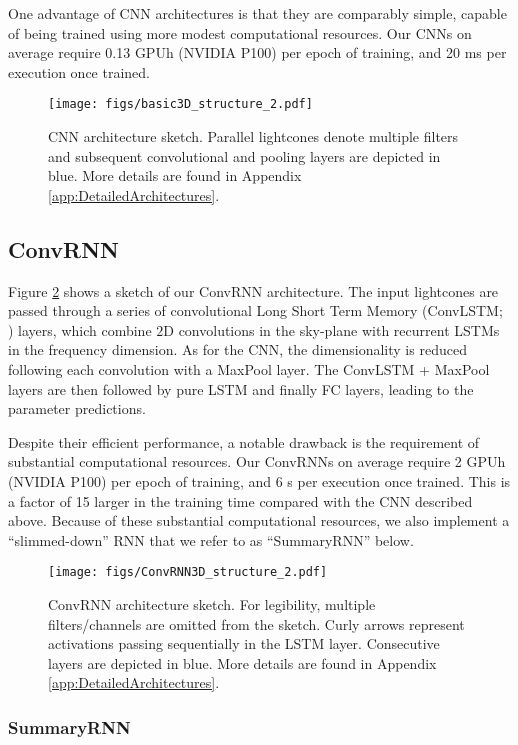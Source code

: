 \documentclass[fleqn,usenatbib]{mnras}
\begin{document}
One advantage of CNN architectures is that they are comparably simple, capable of being trained using more modest computational resources.  Our CNNs on average require 0.13 GPUh (NVIDIA P100)
per epoch of training, and 20 ms per execution once trained.
\begin{figure}
    \centering
    \texttt{[image: figs/basic3D\_structure\_2.pdf]}
    \caption{CNN architecture sketch. Parallel lightcones denote multiple filters and subsequent convolutional and pooling layers are depicted in blue. More details are found in Appendix \ref{app:DetailedArchitectures}.}
    \label{fig:CNN}
\end{figure}

\subsection{ConvRNN}

Figure \ref{fig:ConvLSTM} shows a sketch of our ConvRNN architecture. The input lightcones are passed through a series of convolutional Long Short Term Memory (ConvLSTM; \citealt{ConvLSTM}) layers, which combine $2\mathrm{D}$ convolutions in the sky-plane with recurrent LSTMs in the frequency dimension. As for the CNN, the dimensionality is reduced following each convolution with a MaxPool layer.  The ConvLSTM + MaxPool layers are then followed by pure LSTM and finally FC layers, leading to the parameter predictions. 

Despite their efficient performance, a notable drawback is the requirement of substantial computational resources.  Our ConvRNNs on average require 2 GPUh (NVIDIA P100) per epoch of training, and 6 s per execution once trained.  This is a factor of 15 larger in the training time compared with the CNN described above.  Because of these substantial computational resources, we also implement a ``slimmed-down'' RNN that we refer to as ``SummaryRNN'' below.

\begin{figure}
    \centering
    \texttt{[image: figs/ConvRNN3D\_structure\_2.pdf]}
    \caption{ConvRNN architecture sketch. For legibility, multiple filters/channels are omitted from the sketch. Curly arrows represent activations passing sequentially in the LSTM layer. Consecutive layers are depicted in blue. More details are found in Appendix \ref{app:DetailedArchitectures}.}
    \label{fig:ConvLSTM}
\end{figure}

\subsubsection{SummaryRNN}
\end{document}
